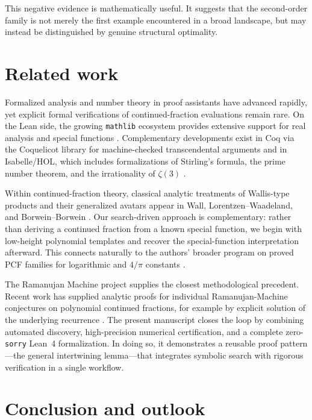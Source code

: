 \documentclass[11pt,reqno]{amsart}
\theoremstyle{plain}
\theoremstyle{definition}
\theoremstyle{remark}
\begin{document}
This negative evidence is mathematically useful.  It suggests that the second-order family is not merely the first example encountered in a broad landscape, but may instead be distinguished by genuine structural optimality.

\section{Related work}\label{sec:related}

Formalized analysis and number theory in proof assistants have advanced rapidly, yet explicit formal verifications of continued-fraction evaluations remain rare.  On the Lean side, the growing \texttt{mathlib} ecosystem provides extensive support for real analysis and special functions \cite{mathlib2020}.  Complementary developments exist in Coq via the Coquelicot library for machine-checked transcendental arguments \cite{boldo2015coquelicot} and in Isabelle/HOL, which includes formalizations of Stirling's formula, the prime number theorem, and the irrationality of $\zeta(3)$ \cite{eberl2016stirling,eberl2018pnt,eberl2019zeta3}.

Within continued-fraction theory, classical analytic treatments of Wallis-type products and their generalized avatars appear in Wall, Lorentzen--Waadeland, and Borwein--Borwein \cite{wall1948analytic,lorentzen1992continued,borwein1987pi}.  Our search-driven approach is complementary: rather than deriving a continued fraction from a known special function, we begin with low-height polynomial templates and recover the special-function interpretation afterward.  This connects naturally to the authors' broader program on proved PCF families for logarithmic and $4/\pi$ constants \cite{papanokechi2026pcf}.

The Ramanujan Machine project \cite{raayoni2021} supplies the closest methodological precedent.  Recent work has supplied analytic proofs for individual Ramanujan-Machine conjectures on polynomial continued fractions, for example by explicit solution of the underlying recurrence \cite{wang2026rm}.  The present manuscript closes the loop by combining automated discovery, high-precision numerical certification, and a complete zero-\texttt{sorry} Lean~4 formalization.  In doing so, it demonstrates a reusable proof pattern---the general intertwining lemma---that integrates symbolic search with rigorous verification in a single workflow.

\section{Conclusion and outlook}
\end{document}

